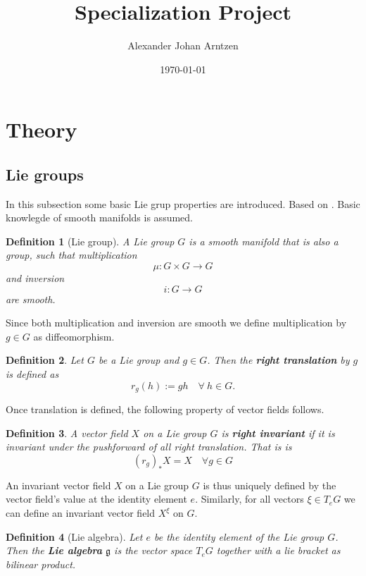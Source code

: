 \documentclass[a4paper]{article}
\title{Specialization Project}
\author{Alexander Johan Arntzen }
\date{\today}
\newtheorem{definition}{Definition}[section]
\begin{document}
\maketitle

\section{Theory}
\subsection{Lie groups}
In this subsection some basic Lie grup properties are introduced. Based on \cite{celledoni2016}. Basic knowlegde of smooth manifolds is assumed. 
\begin{definition}[Lie group]
  A Lie group $G$ is a smooth manifold that is also a group, such that multiplication
  \begin{equation}
    \mu : G \times G \rightarrow G  
  \end{equation}
  and inversion
  \begin{equation}
    i : G  \rightarrow G  
  \end{equation}
  are smooth. 
\end{definition}
Since both  multiplication and inversion are smooth we define multiplication by $g \in G$ as diffeomorphism.
\begin{definition}
  Let $G$ be a Lie group and $g \in G$. Then the \textbf{right translation} by $g$ is defined as
  \begin{equation}
    r_g(h):= gh \quad  \forall \ h  \in G.
  \end{equation}
\end{definition}
Once translation is defined, the following property of vector fields follows. 
\begin{definition}
  A vector field $X$ on a Lie group $G$ is \textbf{right invariant} if it is invariant under the pushforward of all right translation. That is is
  \begin{equation}
    (r_g)_*X = X  \quad \forall g \in G 
  \end{equation}
\end{definition}
An invariant vector field $X$ on a Lie group $G$ is thus uniquely defined by the vector field's value at the identity element $e$. Similarly, for all vectors $\xi \in T_eG$ we can define an invariant vector field  $X^{\xi}$ on $G$. 
\begin{definition}[Lie algebra]
  Let $e$ be the identity element of the Lie group $G$. Then the \textbf{Lie algebra} $\mathfrak{g}$ is the vector space $T_eG$ together with a lie bracket as bilinear product.  
\end{definition}
\end{document}
